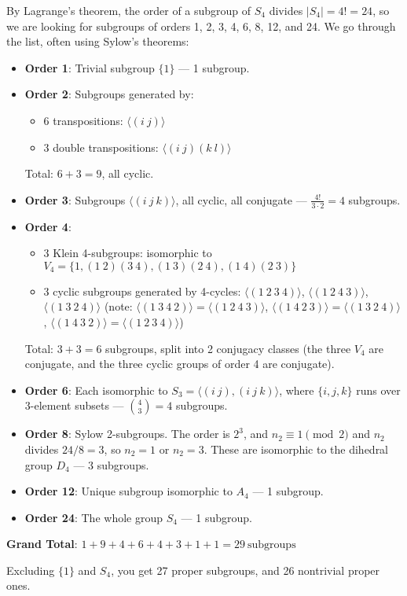 \documentclass{article}
\begin{document}
By Lagrange's theorem, the order of a subgroup of $S_4$ divides $|S_4| = 4! = 24$, so we are looking for subgroups of orders 1, 2, 3, 4, 6, 8, 12, and 24. We go through the list, often using Sylow's theorems:

\begin{itemize}
    \item \textbf{Order 1}: Trivial subgroup $\{1\}$ — 1 subgroup.
    \item \textbf{Order 2}: Subgroups generated by:
    \begin{itemize}
        \item 6 transpositions: $\langle (i\ j) \rangle$
        \item 3 double transpositions: $\langle (i\ j)(k\ l) \rangle$
    \end{itemize}
    Total: $6 + 3 = 9$, all cyclic.

    \item \textbf{Order 3}: Subgroups $\langle (i\ j\ k) \rangle$, all cyclic, all conjugate — $\frac{4!}{3 \cdot 2} = 4$ subgroups.
    
    \item \textbf{Order 4}: 
    \begin{itemize}
        \item 3 Klein 4-subgroups: isomorphic to $V_4 = \{1, (1\ 2)(3\ 4), (1\ 3)(2\ 4), (1\ 4)(2\ 3)\}$
        \item 3 cyclic subgroups generated by 4-cycles: $\langle (1\ 2\ 3\ 4) \rangle$, $\langle (1\ 2\ 4\ 3) \rangle$, $\langle (1\ 3\ 2\ 4) \rangle$ (note: $\langle (1\ 3\ 4\ 2) \rangle = \langle (1\ 2\ 4\ 3) \rangle$, $\langle (1\ 4\ 2\ 3) \rangle = \langle (1\ 3\ 2\ 4) \rangle$, $\langle (1\ 4\ 3\ 2) \rangle = \langle (1\ 2\ 3\ 4) \rangle$)
    \end{itemize}
    Total: $3 + 3 = 6$ subgroups, split into 2 conjugacy classes (the three $V_4$ are conjugate, and the three cyclic groups of order 4 are conjugate).

    \item \textbf{Order 6}: Each isomorphic to $S_3 = \langle (i\ j), (i\ j\ k) \rangle$, where $\{i,j,k\}$ runs over 3-element subsets — $\binom{4}{3} = 4$ subgroups.
    
    \item \textbf{Order 8}: Sylow 2-subgroups. The order is $2^3$, and $n_2 \equiv 1 \pmod{2}$ and $n_2$ divides $24/8 = 3$, so $n_2 = 1$ or $n_2 = 3$. These are isomorphic to the dihedral group $D_4$ — 3 subgroups.
    
    \item \textbf{Order 12}: Unique subgroup isomorphic to $A_4$ — 1 subgroup.
    
    \item \textbf{Order 24}: The whole group $S_4$ — 1 subgroup.
\end{itemize}

\textbf{Grand Total}:  
$1 + 9 + 4 + 6 + 4 + 3 + 1 + 1 = \boxed{29\ \text{subgroups}}$

Excluding $\{1\}$ and $S_4$, you get 27 proper subgroups, and 26 nontrivial proper ones.
\end{document}
